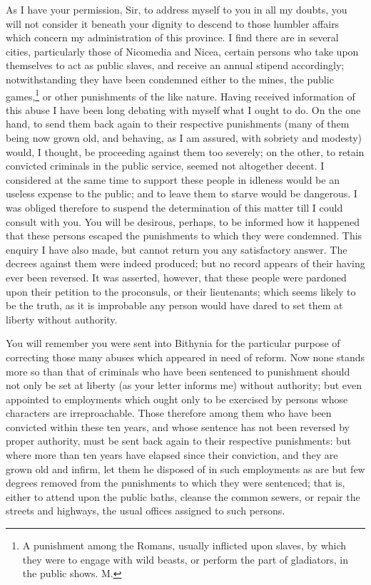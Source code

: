 
As I have your permission, Sir, to address myself to you in all my doubts,
you will not consider it beneath your dignity to descend to those humbler
affairs which concern my administration of this province. I find there are
in several cities, particularly those of Nicomedia and Nicea, certain
persons who take upon themselves to act as public slaves, and receive an
annual stipend accordingly; notwithstanding they have been condemned
either to the mines, the public games,\footnote{A punishment among
the Romans, usually inflicted upon slaves, by which they were to engage
with wild beasts, or perform the part of gladiators, in the public shows.
M.} or other
punishments of the like nature. Having received information of this abuse
I have been long debating with myself what I ought to do. On the one hand,
to send them back again to their respective punishments (many of them
being now grown old, and behaving, as I am assured, with sobriety and
modesty) would, I thought, be proceeding against them too severely; on the
other, to retain convicted criminals in the public service, seemed not
altogether decent. I considered at the same time to support these people
in idleness would be an useless expense to the public; and to leave them
to starve would be dangerous. I was obliged therefore to suspend the
determination of this matter till I could consult with you. You will be
desirous, perhaps, to be informed how it happened that these persons
escaped the punishments to which they were condemned. This enquiry I have
also made, but cannot return you any satisfactory answer. The decrees
against them were indeed produced; but no record appears of their having
ever been reversed. It was asserted, however, that these people were
pardoned upon their petition to the proconsuls, or their lieutenants;
which seems likely to be the truth, as it is improbable any person would
have dared to set them at liberty without authority.


You will remember you were sent into Bithynia for the particular purpose
of correcting those many abuses which appeared in need of reform. Now none
stands more so than that of criminals who have been sentenced to
punishment should not only be set at liberty (as your letter informs me)
without authority; but even appointed to employments which ought only to
be exercised by persons whose characters are irreproachable. Those
therefore among them who have been convicted within these ten years, and
whose sentence has not been reversed by proper authority, must be sent
back again to their respective punishments: but where more than ten years
have elapsed since their conviction, and they are grown old and infirm,
let them he disposed of in such employments as are but few degrees removed
from the punishments to which they were sentenced; that is, either to
attend upon the public baths, cleanse the common sewers, or repair the
streets and highways, the usual offices assigned to such persons.

